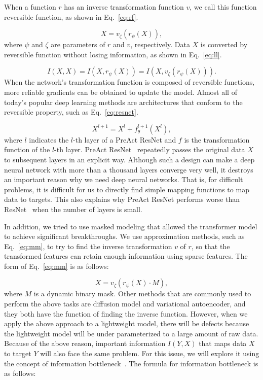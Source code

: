 \documentclass[10pt,twocolumn,letterpaper]{article}
\begin{document}
	When a function $r$ has an inverse transformation function $v$, we call this function reversible function, as shown in Eq.~\ref{eq:rf}.
	
	\begin{equation}
	X = v_{\zeta}(r_{\psi}(X)),
	\label{eq:rf}
	\end{equation}
	where $\psi$ and $\zeta$ are parameters of $r$ and $v$, respectively.  Data $X$ is converted by reversible function without losing information, as shown in Eq.~\ref{eq:ll}.
	
	\begin{equation}
	I(X,X) = I(X, r_{\psi}(X)) = I(X, v_{\zeta}(r_{\psi}(X))).
	\label{eq:ll}
	\end{equation}		
	When the network's transformation function is composed of reversible functions, more reliable gradients can be obtained to update the model.  Almost all of today's popular deep learning methods are architectures that conform to the reversible property, such as Eq.~\ref{eq:resnet}.
	
	\begin{equation}
	X^{l+1} = X^{l} + f^{l+1}_{\theta}(X^{l}),
	\label{eq:resnet}
	\end{equation}
	where $l$ indicates the $l$-th layer of a PreAct ResNet and $f$ is the transformation function of the $l$-th layer.  PreAct ResNet~\cite{he2016identity} repeatedly passes the original data $X$ to subsequent layers in an explicit way.  Although such a design can make a deep neural network with more than a thousand layers converge very well, it destroys an important reason why we need deep neural networks. That is, for difficult problems, it is difficult for us to directly find simple mapping functions to map data to targets.  This also explains why PreAct ResNet performs worse than ResNet~\cite{he2016deep} when the number of layers is small.
	
	In addition, we tried to use masked modeling that allowed the transformer model to achieve significant breakthroughs.  We use approximation methods, such as Eq.~\ref{eq:mm}, to try to find the inverse transformation $v$ of $r$, so that the transformed features can retain enough information using sparse features.  The form of Eq.~\ref{eq:mm} is as follows:
	
	\begin{equation}
	X = v_{\zeta}(r_{\psi}(X) \cdot M),
	\label{eq:mm}
	\end{equation}
	where $M$ is a dynamic binary mask.  Other methods that are commonly used to perform the above tasks are diffusion model and variational autoencoder, and they both have the function of finding the inverse function.  However, when we apply the above approach to a lightweight model, there will be defects because the lightweight model will be under parameterized to a large amount of raw data.  Because of the above reason, important information $I(Y,X)$ that maps data $X$ to target $Y$ will also face the same problem.  For this issue, we will explore it using the concept of information bottleneck~\cite{tishby2015deep}. The formula for information bottleneck is as follows:
	
\end{document}

